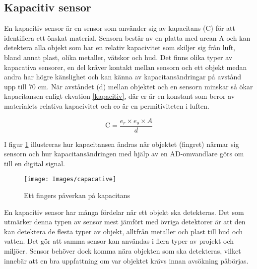\documentclass[11pt]{article}
\begin{document}
\begin{flushleft}
\subsection{Kapacitiv sensor}
En kapacitiv sensor är en sensor som använder sig av kapacitans (C) för att identifiera ett önskat material. Sensorn består av en platta med arean A och kan detektera alla objekt som har en relativ kapacivitet som skiljer sig från luft, bland annat plast, olika metaller, vätskor och hud. Det finns olika typer av kapacativa sensorer, en del kräver kontakt mellan sensorn och ett objekt medan andra har högre känslighet och kan känna av kapacitansändringar på avstånd upp till 70 cm. När avståndet (d) mellan objektet och en sensorn minskar så ökar kapacitansen enligt ekvation \ref{kapacitiv}, där er är en konstant som beror av materialets relativa kapacivitet och eo är en permitiviteten i luften.\cite{website:capacative}


\begin{equation}\label{kapacitiv}
	\textrm{C} = \frac {e_{r} \times e_{o} \times A}{d}						
\end{equation}

I figur \ref{capacative} illustreras hur kapacitansen ändras när objektet (fingret) närmar sig sensorn och hur kapacitansändringen med hjälp av en AD-omvandlare görs om till en digital signal. 

\begin{figure}[htbp]
	\centering
	\texttt{[image: Images/capacative]}
	\caption{Ett fingers påverkan på kapacitans \label{capacative}}
\end{figure}

En kapacitiv sensor har många fördelar när ett objekt ska detekteras. Det som utmärker denna typen av sensor mest jämfört med övriga detektorer är att den kan detektera de flesta typer av objekt, alltfrån metaller och plast till hud och vatten. Det gör att samma sensor kan användas i flera typer av projekt och miljöer. Sensor behöver dock komma nära objekten som ska detekteras, vilket innebär att en bra uppfattning om var objektet krävs innan avsökning påbörjas. \cite{website:capacative}




\end{flushleft}
\end{document}
